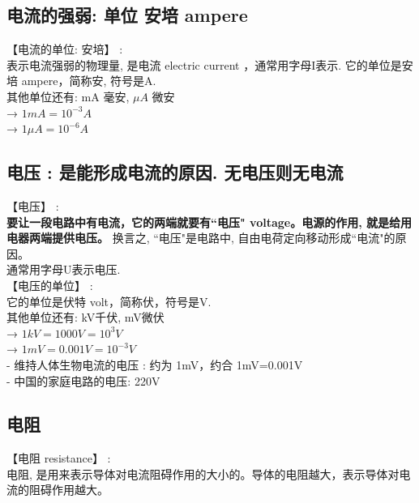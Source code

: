 \documentclass[UTF8]{ctexart}
\begin{document}
	\vspace{1em} 
	
	
	\subsection{电流的强弱: 单位 安培 ampere}
	
	【电流的单位: 安培】 : \\
	表示电流强弱的物理量, 是电流 electric current ，通常用字母I表示. 它的单位是安培 ampere，简称安, 符号是A. \\
	
	其他单位还有: mA 毫安, $\mu A$ 微安\\
	→ $1 mA = 10^{-3}A$ \\
	→ $1 \mu A = 10^{-6}A$ \\
	



\subsection{电压 : 是能形成电流的原因. 无电压则无电流}

【电压】 : \\
\textbf{要让一段电路中有电流，它的两端就要有``电压" voltage。电源的作用, 就是给用电器两端提供电压。} 换言之, ``电压"是电路中, 自由电荷定向移动形成``电流"的原因。  \\
通常用字母U表示电压. \\


【电压的单位】 : \\
它的单位是伏特 volt，简称伏，符号是V. \\

其他单位还有: kV千伏, mV微伏 \\
→ $1 kV = 1000V = 10^3V$ \\
→ $1 mV = 0.001V = 10^{-3}V$ \\

- 维持人体生物电流的电压 : 约为 1mV，约合 1mV=0.001V \\
- 中国的家庭电路的电压: 220V \\

\vspace{1em} 


\subsection{电阻}

【电阻 resistance】 : \\
电阻, 是用来表示导体对电流阻碍作用的大小的。导体的电阻越大，表示导体对电流的阻碍作用越大。 \\
\end{document}
